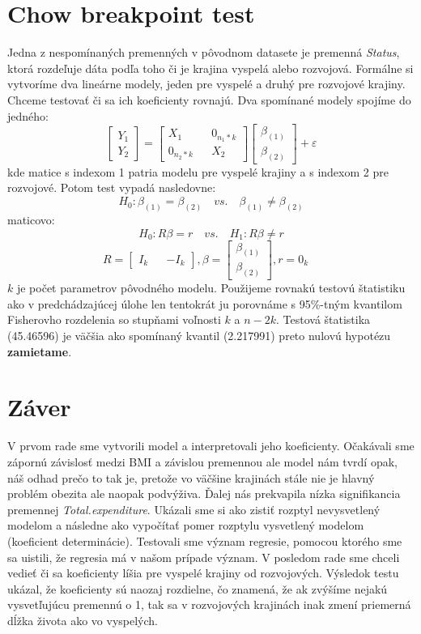 \section*{Chow breakpoint test}
Jedna z nespomínaných premenných v pôvodnom datasete je premenná \textit{Status}, ktorá rozdeľuje dáta podľa toho či je krajina vyspelá alebo rozvojová.
Formálne si vytvoríme dva lineárne modely, jeden pre vyspelé a druhý pre rozvojové krajiny. Chceme testovať či sa ich koeficienty rovnajú.
Dva spomínané modely spojíme do jedného:
\[
    \begin{bmatrix}
        Y_1 \\
        Y_2 
    \end{bmatrix}
    =
    \begin{bmatrix}
        X_1 && 0_{n_1*k} \\
        0_{n_2*k} && X_2
    \end{bmatrix}
    \begin{bmatrix}
        \beta_{(1)} \\
        \beta_{(2)}
    \end{bmatrix}
    +
    \varepsilon
\]
kde matice s indexom 1 patria modelu pre vyspelé krajiny a s indexom 2 pre rozvojové.
Potom test vypadá nasledovne:
\[
    H_0: \beta_{(1)} = \beta_{(2)} \quad vs. \quad  \beta_{(1)} \ne \beta_{(2)} 
\]
maticovo:
\[
    H_0: R\beta = r \quad vs. \quad H_1: R\beta \ne r 
\]
\[
    R =  \begin{bmatrix}
        I_k && -I_k
    \end{bmatrix},
    \beta = \begin{bmatrix}
        \beta_{(1)} \\
        \beta_{(2)}
    \end{bmatrix},
    r = 0_k
    \quad
\]
$k$ je počet parametrov pôvodného modelu. Použijeme rovnakú testovú štatistiku ako v predchádzajúcej úlohe len tentokrát ju 
porovnáme s 95\%-tným kvantilom Fisherovho rozdelenia so stupňami voľnosti $k$ a $n-2k$. Testová štatistika (45.46596) je väčšia ako spomínaný kvantil (2.217991)
preto nulovú hypotézu \textbf{zamietame}.

\section*{Záver}
V prvom rade sme vytvorili model a interpretovali jeho koeficienty. Očakávali sme zápornú závislosť medzi BMI a závislou premennou ale model
nám tvrdí opak, náš odhad prečo to tak je, pretože vo väčšine krajinách stále nie je hlavný problém obezita ale naopak podvýživa. Ďalej nás prekvapila nízka signifikancia premennej \textit{Total.expenditure}.
Ukázali sme si ako zistiť rozptyl nevysvetlený modelom a následne ako vypočítať pomer rozptylu vysvetlený modelom (koeficient determinácie). Testovali sme význam regresie, pomocou ktorého sme sa uistili, že regresia má v našom 
prípade význam. V posledom rade sme chceli vedieť či sa koeficienty líšia pre vyspelé krajiny od rozvojových. Výsledok testu ukázal, že koeficienty sú naozaj rozdielne, čo znamená, že
ak zvýšíme nejakú vysvetľujúcu premennú o 1, tak sa v rozvojových krajinách inak zmení priemerná dĺžka života ako vo vyspelých.